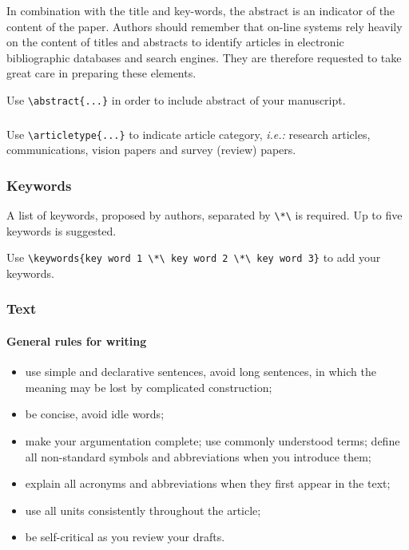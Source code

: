 \documentclass[CEJCS,PDF]{cej} %
\begin{document}
In combination with the title and key-words, the abstract is an indicator of the content of the paper. Authors should remember that on-line systems rely heavily on the content of titles and abstracts to identify articles in electronic bibliographic databases and search engines. They are therefore requested to take great care in preparing these elements.

Use {\tt \verb+\abstract{...}+} in order to include abstract of your manuscript.

\subsubsection{}

Use {\tt \verb+\articletype{...}+} to indicate article category, {\em i.e.:} research articles, communications, vision papers and survey (review) papers.

\subsubsection{Keywords}

A list of keywords, proposed by authors, separated by {\tt \verb+\*\+}  is required. Up to five keywords is suggested.

Use {\tt \verb+\keywords{key word 1 \*\ key word 2 \*\ key word 3}+} to add your keywords.

\subsubsection{Text}

\paragraph{General rules for writing}
\begin{itemize}
\item use simple and declarative sentences, avoid long sentences, in which the meaning may be lost by complicated construction;
\item be concise, avoid idle words;
\item make your argumentation complete; use commonly understood terms; define all non-standard symbols and abbreviations when you introduce them;
\item explain all acronyms and abbreviations when they first appear in the text;
\item use all units consistently throughout the article;
\item be self-critical as you review your drafts.
\end{itemize}
\end{document}
